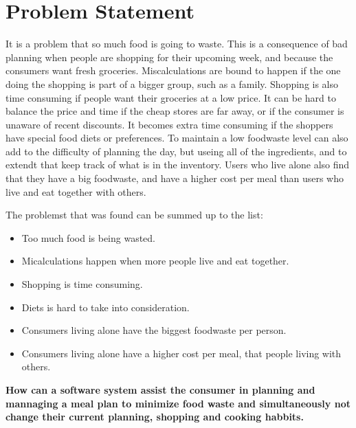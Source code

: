 \chapter{Problem Statement}
It is a problem that so much food is going to waste.
This is a consequence of bad planning when people are shopping for their upcoming week, and because the consumers want fresh groceries.
Miscalculations are bound to happen if the one doing the shopping is part of a bigger group, such as a family.
Shopping is also time consuming if people want their groceries at a low price.
It can be hard to balance the price and time if the cheap stores are far away, or if the consumer is unaware of recent discounts.
It becomes extra time consuming if the shoppers have special food diets or preferences.
To maintain a low foodwaste level can also add to the difficulty of planning the day, but useing all of the ingredients, and to extendt that keep track of what is in the inventory.
Users who live alone also find that they have a big foodwaste, and have a higher cost per meal than users who live and eat together with others.

The problemst that was found can be summed up to the list:

\begin{itemize}
    \item Too much food is being wasted.
    \item Micalculations happen when more people live and eat together.
    \item Shopping is time consuming.
    \item Diets is hard to take into consideration.
    \item Consumers living alone have the biggest foodwaste per person.
    \item Consumers living alone have a higher cost per meal, that people living with others.
\end{itemize}

\textbf{How can a software system assist the consumer in planning and mannaging a meal plan to minimize food waste and simultaneously not change their current planning, shopping and cooking habbits.}